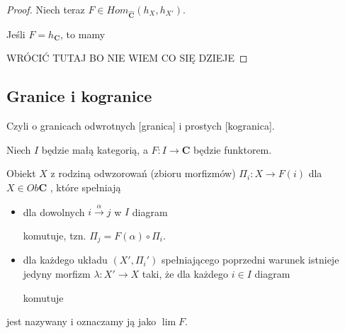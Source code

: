 \begin{proof}
  Niech teraz $F\in Hom_{\mathbf{\hat{C}}}(h_X,h_{X'})$.

  Jeśli $F=h_{\mathbf{C}}$, to mamy
  \begin{center}\end{center}

  {\large\color{red}WRÓCIĆ TUTAJ BO NIE WIEM CO SIĘ DZIEJE}

\end{proof}

\subsection{Granice i kogranice}

Czyli o granicach odwrotnych [granica] i prostych [kogranica].

Niech $I$ będzie małą kategorią, a $F:I\to\mathbf{C}$ będzie funktorem.

\begin{definition}
  Obiekt $X$ z rodziną odwzorowań (zbioru morfizmów) $\Pi_i:X\to F(i)$ dla $X\in Ob\mathbf{C}$ , które spełniają
  \begin{itemize}
    \item \acc{[zgodność]} dla dowolnych $i\xrightarrow{\alpha}j$ w $I$ diagram
      \begin{center}\end{center}
      komutuje, tzn. $\Pi_j=F(\alpha)\circ\Pi_i$.
    \item \acc{[uniwersalność]} dla każdego układu $(X',\Pi_i')$ spełniającego poprzedni warunek istnieje jedyny morfizm $\lambda:X'\to X$ taki, że dla każdego $i\in I$ diagram
      \begin{center}\end{center}
    komutuje
  \end{itemize}
  jest nazywany  i oznaczamy ją jako $\lim F$.
\end{definition}

